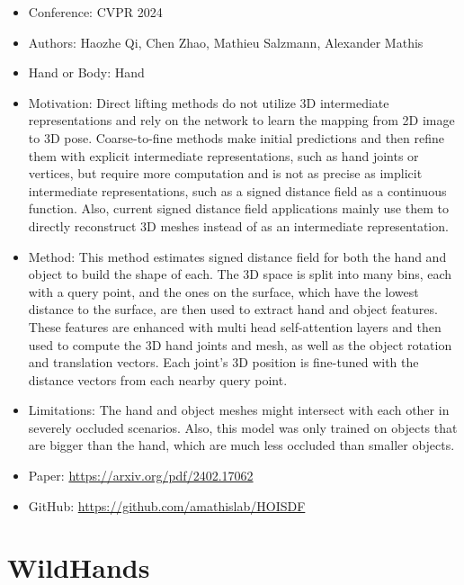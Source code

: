 \documentclass{article}
\begin{document}
\begin{itemize}
    \item Conference: CVPR 2024
    \item Authors: Haozhe Qi, Chen Zhao, Mathieu Salzmann, Alexander Mathis
    \item Hand or Body: Hand
    \item Motivation: Direct lifting methods do not utilize 3D intermediate representations and rely on the network to learn the mapping from 2D image to 3D pose. Coarse-to-fine methods make initial predictions and then refine them with explicit intermediate representations, such as hand joints or vertices, but require more computation and is not as precise as implicit intermediate representations, such as a signed distance field as a continuous function. Also, current signed distance field applications mainly use them to directly reconstruct 3D meshes instead of as an intermediate representation.
    \item Method: This method estimates signed distance field for both the hand and object to build the shape of each. The 3D space is split into many bins, each with a query point, and the ones on the surface, which have the lowest distance to the surface, are then used to extract hand and object features. These features are enhanced with multi head self-attention layers and then used to compute the 3D hand joints and mesh, as well as the object rotation and translation vectors. Each joint's 3D position is fine-tuned with the distance vectors from each nearby query point.
    \item Limitations: The hand and object meshes might intersect with each other in severely occluded scenarios. Also, this model was only trained on objects that are bigger than the hand, which are much less occluded than smaller objects.
    \item Paper: \url{https://arxiv.org/pdf/2402.17062}
    \item GitHub: \url{https://github.com/amathislab/HOISDF}
\end{itemize}

\section*{WildHands}
\end{document}
